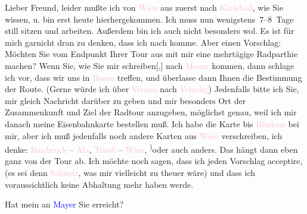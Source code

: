 \pstart
           Lieber Freund, leider mußte ich von \textcolor{pink}{Wien}{}\ledrightnote{\textcolor{pink}{Wien}} aus zuerst nach \textcolor{pink}{Karlsbad}{}\ledrightnote{\textcolor{pink}{Karlsbad}}, wie Sie wissen, u. bin erst heute
               hierhergekommen. Ich muss nun wenigstens 7–8 Tage still sitzen und arbeiten. Außerdem
               bin ich auch nicht besonders wol. Es ist für mich garnicht dran zu denken, dass ich
               nach \label{K_L03310-1v}\label{K_L03310-1h} komme. Aber einen Vorschlag: Möchten Sie vom Endpunkt Ihrer Tour aus mit mir
               eine mehrtägige Radparthie machen? Wenn Sie, wie Sie mir
                  schreiben{[},{]} nach \textcolor{pink}{Meran}{}\ledrightnote{\textcolor{pink}{Meran}}
               kommen, dann schlage ich vor, dass wir uns in \textcolor{pink}{Bozen}{}\ledrightnote{\textcolor{pink}{Bozen}} treffen, und überlasse dann Ihnen die Bestimmung der Route. (Gerne {\pb}würde ich über \textcolor{pink}{Verona}{}\ledrightnote{\textcolor{pink}{Verona}} nach \textcolor{pink}{Venedig}{}\ledrightnote{\textcolor{pink}{Venedig}})
               Jedenfalls bitte ich Sie, mir gleich Nachricht darüber zu geben und mir besonders Ort
               der Zusammenkunft und Ziel der Radtour anzugeben, möglichst genau, weil ich mir
               danach meine Eisenbahnkarte bestellen muß. Ich habe die Karte bis \textcolor{pink}{Bludenz}{}\ledrightnote{\textcolor{pink}{Bludenz}} bei mir, aber ich muß jedenfalls noch andere Karten
               aus \textcolor{pink}{Wien}{}\ledrightnote{\textcolor{pink}{Wien}} verschreiben, ich denke: \strikeout{(}\textcolor{pink}{Innsbruck}{}\ledrightnote{\textcolor{pink}{Innsbruck}} – \textcolor{pink}{Ala}{}\ledrightnote{\textcolor{pink}{Ala}}, \textcolor{pink}{Triest}{}\ledrightnote{\textcolor{pink}{Triest}} – \textcolor{pink}{Wien}{}\ledrightnote{\textcolor{pink}{Wien}}, \substVorne{}\textsuperscript{)}\substDazwischen{}o\substHinten{}der auch anders. Das hängt dann eben ganz von der Tour ab. {\pb}Ich möchte noch sagen, dass ich
               jeden Vorschlag acceptire, (es sei denn \textcolor{pink}{Schweiz}{}\ledrightnote{\textcolor{pink}{Schweiz}}, was mir vielleicht zu theuer wäre) und dass ich voraussichtlich keine
               Abhaltung mehr haben werde.\pend
           
\pstart
           Hat mein \label{K_L03310-2v}\label{K_L03310-2h} an \textcolor{blue}{Mayer}{}\ledrightnote{\textcolor{blue}{Oskar Mayer}} Sie erreicht?\pend
           

